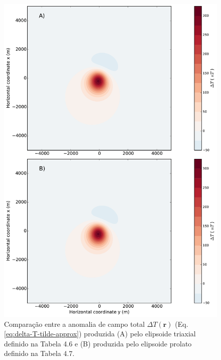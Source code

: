 \begin{figure}[hbt!]
	\centering \includegraphics[width=14.5 cm,height=22 cm]{figures/ellipsoid_triaxial_prolate}
	\caption[Comparação entre a anomalia de campo total $\Delta T (\mathbf{r})$ (Eq. \ref{eq:delta-T-tilde-approx}) produzida (A) pelo elipsoide triaxial definido na Tabela 4.6 e (B) produzida pelo elipsoide prolato definido na Tabela 4.7.]{Comparação entre a anomalia de campo total $\Delta T (\mathbf{r})$ (Eq. \ref{eq:delta-T-tilde-approx}) produzida (A) pelo elipsoide triaxial definido na Tabela 4.6 e (B) produzida pelo elipsoide prolato definido na Tabela 4.7.}
	\label{fig:triaxial_prolate}
\end{figure}

